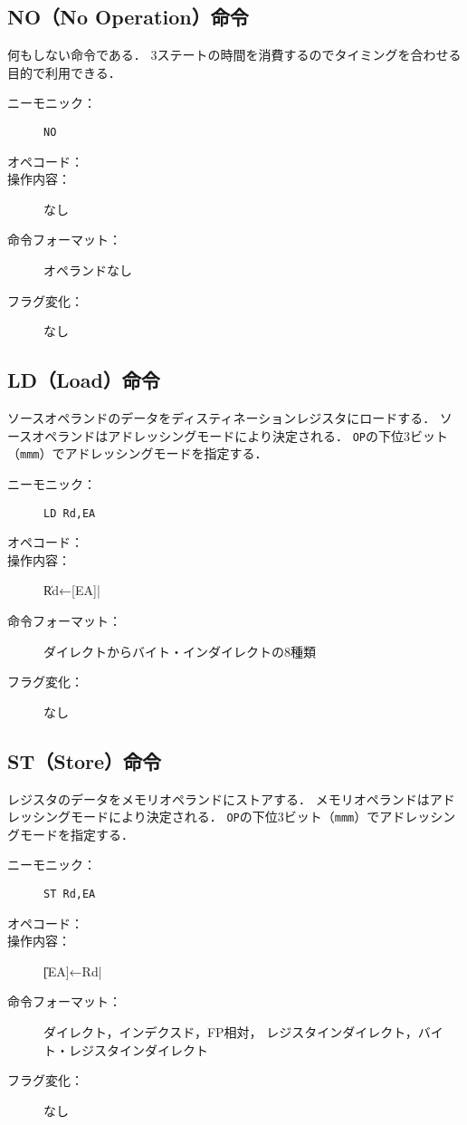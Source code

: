 \subsection{NO（No Operation）命令}
何もしない命令である．
3ステートの時間を消費するのでタイミングを合わせる目的で利用できる．

\begin{description}
\item[ニーモニック：] \texttt{NO}
\item[オペコード：] 
\item[操作内容：] なし
\item[命令フォーマット：] オペランドなし
\item[フラグ変化：] なし
\end{description}

\subsection{LD（Load）命令}
ソースオペランドのデータをディスティネーションレジスタにロードする．
ソースオペランドはアドレッシングモードにより決定される．
\texttt{OP}の下位3ビット（\texttt{mmm}）でアドレッシングモードを指定する．

\begin{description}
\item[ニーモニック：] \texttt{LD Rd,EA}
\item[オペコード：] 
\item[操作内容：] \|Rd←[EA]|
\item[命令フォーマット：] ダイレクトからバイト・インダイレクトの8種類
\item[フラグ変化：] なし
\end{description}

\subsection{ST（Store）命令}
レジスタのデータをメモリオペランドにストアする．
メモリオペランドはアドレッシングモードにより決定される．
\texttt{OP}の下位3ビット（\texttt{mmm}）でアドレッシングモードを指定する．

\begin{description}
\item[ニーモニック：] \texttt{ST Rd,EA}
\item[オペコード：] 
\item[操作内容：] \|[EA]←Rd|
\item[命令フォーマット：] ダイレクト，インデクスド，FP相対，
レジスタインダイレクト，バイト・レジスタインダイレクト
\item[フラグ変化：] なし
\end{description}

